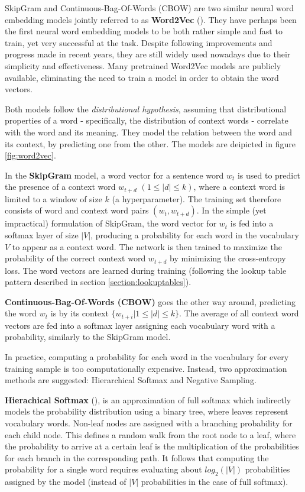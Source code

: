 SkipGram and Continuous-Bag-Of-Words (CBOW) are two similar neural word embedding models jointly referred to as \textbf{Word2Vec} (\cite{word2vec}). They have perhaps been the first neural word embedding models to be both rather simple and fast to train, yet very successful at the task. Despite following improvements and progress made in recent years, they are still widely used nowadays due to their simplicity and effectiveness. Many pretrained Word2Vec models are publicly available, eliminating the need to train a model in order to obtain the word vectors. 

Both models follow the \emph{distributional hypothesis}, assuming that distributional properties of a word - specifically, the distribution of context words - correlate with the word and its meaning. They model the relation between the word and its context, by predicting one from the other. The models are deipicted in figure \ref{fig:word2vec}. 

In the \textbf{SkipGram} model, a word vector for a sentence word $w_t$ is used to predict the presence of a context word $w_{t+d}$ $(1 \leq |d| \leq k)$, where a context word is limited to a window of size $k$ (a hyperparameter). The training set therefore consists of word and context word pairs $(w_t, w_{t+d})$. In the simple (yet impractical) formulation of SkipGram, the word vector for $w_t$ is fed into a softmax layer of size $|V|$, producing a probability for each word in the vocabulary $V$ to appear as a context word. The network is then trained to maximize the probability of the correct context word $w_{t+d}$ by minimizing the cross-entropy loss. The word vectors are learned during training (following the lookup table pattern described in section \ref{section:lookuptables}).

\textbf{Continuous-Bag-Of-Words (CBOW)} goes the other way around, predicting the word $w_t$ is by its context $\{w_{t+i} | 1 \leq |d| \leq k\}$. The average of all context word vectors are fed into a softmax layer assigning each vocabulary word with a probability, similarly to the SkipGram model. 

In practice, computing a probability for each word in the vocabulary for every training sample is too computationally expensive. Instead, two approximation methods are suggested: Hierarchical Softmax and Negative Sampling. 

\textbf{Hierachical Softmax} (\cite{hierarchicalsoftmax}), is an approximation of full softmax which indirectly models the probability distribution using a binary tree, where leaves represent vocabulary words. Non-leaf nodes are assigned with a branching probability for each child node. This defines a random walk from the root node to a leaf, where the probability to arrive at a certain leaf is the multiplication of the probabilities for each branch in the corresponding path. It follows that computing the probability for a single word requires evaluating about $log_2(|V|)$ probabilities assigned by the model (instead of $|V|$ probabilities in the case of full softmax).

